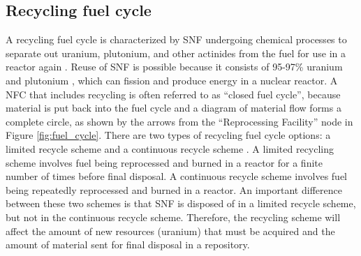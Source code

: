 \subsection{Recycling fuel cycle}
A recycling fuel cycle is characterized by \gls{SNF} undergoing chemical 
processes to separate out uranium, plutonium, and other 
actinides from the fuel for use in a reactor again \cite{rodriguez-penalonga_review_2017}. 
Reuse of \gls{SNF} is possible because it consists of 95-97\% uranium and 
plutonium \cite{rodriguez-penalonga_review_2017}, which can fission and 
produce energy in a nuclear reactor. A \gls{NFC} that includes 
recycling is often referred to as ``closed fuel cycle'', because material is 
put back into the fuel cycle and a diagram of material flow forms 
a complete circle, as shown by the arrows from the ``Reprocessing Facility''
node in Figure \ref{fig:fuel_cycle}. 
There are two types of recycling fuel cycle options: a limited 
recycle scheme and a continuous recycle scheme \cite{wigeland_nuclear_2014}. 
A limited recycling scheme involves fuel being reprocessed and burned in 
a reactor for a finite number of times before final disposal. A continuous 
recycle scheme involves fuel being repeatedly reprocessed and burned in 
a reactor. An 
important difference between these two schemes is that \gls{SNF} is 
disposed of in a limited recycle scheme, but not in the continuous 
recycle scheme. Therefore, the recycling scheme will affect the amount of 
new resources (uranium) that must be acquired and the amount of material 
sent for final disposal in a repository. 

